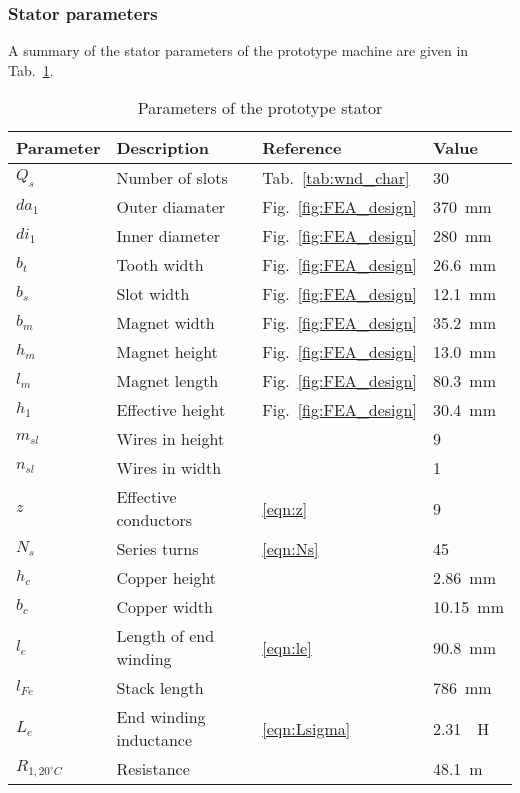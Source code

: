 \subsubsection{Stator parameters}
A summary of the stator parameters of the prototype machine are given in Tab.~\ref{tab:PropertiesOfTheWinding}.
\begin{table}[htbp]
	\centering
	\caption{Parameters of the prototype stator}
	\begin{tabular}{llll}
		  \toprule
		  Parameter & Description     & Reference          & Value\\
		  \toprule
		  $Q_s$     & Number of slots & Tab.~\ref{tab:wnd_char}  & \num{30}\\\midrule
		  $da_1$    & Outer diamater  & Fig.~\ref{fig:FEA_design}& \SI{370}{mm}\\\midrule
		  $di_1$    & Inner diameter  & Fig.~\ref{fig:FEA_design}& \SI{280}{mm}\\\midrule
		  $b_t$     & Tooth width     & Fig.~\ref{fig:FEA_design}& \SI{26.6}{mm}\\\midrule 
		  $b_s$     & Slot width      & Fig.~\ref{fig:FEA_design}& \SI{12.1}{mm}\\\midrule  
		  $b_m$     & Magnet width    & Fig.~\ref{fig:FEA_design}& \SI{35.2}{mm}\\\midrule 
		  $h_m$     & Magnet height   & Fig.~\ref{fig:FEA_design}& \SI{13.0}{mm}\\\midrule 
		  $l_m$     & Magnet length   & Fig.~\ref{fig:FEA_design}& \SI{80.3}{mm}\\\midrule 
		  $h_1$     & Effective height& Fig.~\ref{fig:FEA_design}& \SI{30.4}{mm}\\\midrule
		  $m_{sl}$  & Wires in height &                          & \num{9}\\\midrule
		  $n_{sl}$  & Wires in width  &                          & \num{1}\\\midrule
		  $z$       & Effective conductors & \eqref{eqn:z}       & \num{9}\\\midrule
		  $N_s$     & Series turns    & \eqref{eqn:Ns}           & \num{45}\\\midrule  
		  $h_c$     & Copper height   &                          & \SI{2.86}{mm}\\\midrule  
		  $b_c$     & Copper width    &                          & \SI{10.15}{mm}\\\midrule
		  $l_e$     & Length of end winding& \eqref{eqn:le}      & \SI{90.8}{mm}\\\midrule
		  $l_{Fe}$  & Stack length    &                          & \SI{786}{mm}\\\midrule
		  $L_e$     & End winding inductance& \eqref{eqn:Lsigma} &%
		              \SI{2.31}{\mu H}\\\midrule
		  $R_{1,20^{\circ}C}$ & Resistance&                   &\SI{48.1}{m\Omega}\\\midrule
	\end{tabular}
	\label{tab:PropertiesOfTheWinding}
\end{table}

